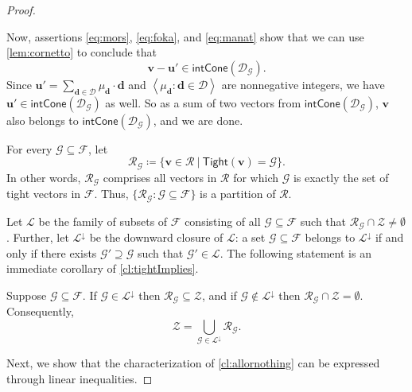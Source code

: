 \documentclass{article}
\newcommand{\Dd}{\mathcal{D}}
\newcommand{\tup}[1]{{\mathbf{#1}}}
\newcommand{\dd}{\tup d}
\newcommand{\uu}{\tup u}
\newcommand{\myvv}{\tup v} %
\newcommand{\mset}[1]{\left\langle #1\right\rangle}
\newcommand{\Ff}{\mathcal{F}}
\newcommand{\Gg}{\mathcal{G}}
\newcommand{\Rr}{\mathcal{R}}
\newcommand{\Zz}{\mathcal{Z}}
\newcommand{\Ss}{\mathscr{L}}
\newcommand{\Tight}{\mathsf{Tight}}
\newcommand{\intcone}{\mathsf{intCone}}
\begin{document}
\begin{proof}
\begin{subproof}
 Now, assertions \cref{eq:mors}, \cref{eq:foka}, and \cref{eq:manat} show that we can use \cref{lem:cornetto} to conclude that
 $$\myvv-\uu'\in \intcone(\Dd_\Gg).$$
 Since $\uu'=\sum_{\dd\in \Dd} \mu_\dd\cdot \dd$ and $\mset{\mu_\dd\colon \dd\in \Dd}$ are nonnegative integers, we have $\uu'\in \intcone(\Dd_\Gg)$ as well. So as a sum of two vectors from $\intcone(\Dd_\Gg)$, $\myvv$ also belongs to $\intcone(\Dd_\Gg)$, and we are done.
\end{subproof}

For every $\Gg\subseteq \Ff$, let
$$\Rr_\Gg\coloneqq \{\myvv\in \Rr~|~\Tight(\myvv)=\Gg\}.$$
In other words, $\Rr_\Gg$ comprises all vectors in $\Rr$ for which $\Gg$ is exactly the set of tight vectors in $\Ff$. Thus, $\{\Rr_\Gg\colon \Gg\subseteq \Ff\}$ is a partition of $\Rr$.

Let $\Ss$ be the family of subsets of $\Ff$ consisting of all $\Gg\subseteq \Ff$ such that $\Rr_\Gg\cap \Zz\neq \emptyset$. Further, let $\Ss^{\downarrow}$ be the downward closure of $\Ss$: a set $\Gg\subseteq \Ff$ belongs to $\Ss^\downarrow$ if and only if there exists $\Gg'\supseteq \Gg$ such that $\Gg'\in \Ss$.
The following statement is an immediate corollary of \cref{cl:tightImplies}.

\begin{techclaim}\label{cl:allornothing}
Suppose $\Gg\subseteq \Ff$. If $\Gg\in \Ss^{\downarrow}$ then $\Rr_\Gg\subseteq \Zz$, and if $\Gg\notin \Ss^{\downarrow}$ then $\Rr_\Gg\cap \Zz=\emptyset$. Consequently,
$$\Zz=\bigcup_{\Gg\in \Ss^\downarrow} \Rr_\Gg.$$
\end{techclaim}

Next, we show that the characterization of \cref{cl:allornothing} can be expressed through linear inequalities.


\end{proof}
\end{document}
